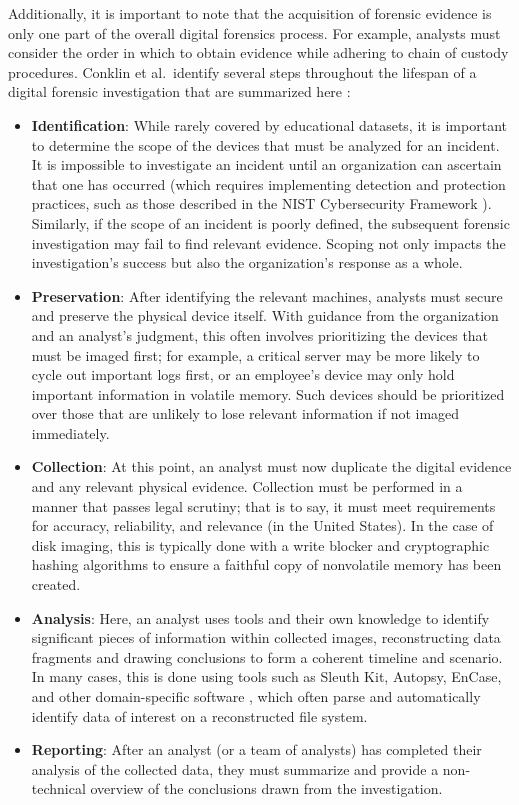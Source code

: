 \documentclass[letterpaper,12pt]{report}
\def\tightlist{}
\begin{document}
Additionally, it is important to note that the acquisition of forensic
evidence is only one part of the overall digital forensics process. For
example, analysts must consider the order in which to obtain evidence
while adhering to chain of custody procedures. Conklin et al.~identify
several steps throughout the lifespan of a digital forensic
investigation that are summarized here
\cite{conklinComputerForensics2022}:

\begin{itemize}
\tightlist
\item
  \textbf{Identification}: While rarely covered by educational datasets,
  it is important to determine the scope of the devices that must be
  analyzed for an incident. It is impossible to investigate an incident
  until an organization can ascertain that one has occurred (which
  requires implementing detection and protection practices, such as
  those described in the NIST Cybersecurity Framework
  \cite{nistNISTCybersecurityFramework2023}). Similarly, if the
  scope of an incident is poorly defined, the subsequent forensic
  investigation may fail to find relevant evidence. Scoping not only
  impacts the investigation's success but also the organization's
  response as a whole.
\item
  \textbf{Preservation}: After identifying the relevant machines,
  analysts must secure and preserve the physical device itself. With
  guidance from the organization and an analyst's judgment, this often
  involves prioritizing the devices that must be imaged first; for
  example, a critical server may be more likely to cycle out important
  logs first, or an employee's device may only hold important
  information in volatile memory. Such devices should be prioritized
  over those that are unlikely to lose relevant information if not
  imaged immediately.
\item
  \textbf{Collection}: At this point, an analyst must now duplicate the
  digital evidence and any relevant physical evidence. Collection must
  be performed in a manner that passes legal scrutiny; that is to say,
  it must meet requirements for accuracy, reliability, and relevance
  \cite{conklinComputerForensics2022,garfinkelBringingScienceDigital2009}
  (in the United States). In the case of disk imaging, this is typically
  done with a write blocker and cryptographic hashing algorithms to
  ensure a faithful copy of nonvolatile memory has been created.
\item
  \textbf{Analysis}: Here, an analyst uses tools and their own knowledge
  to identify significant pieces of information within collected images,
  reconstructing data fragments and drawing conclusions to form a
  coherent timeline and scenario. In many cases, this is done using
  tools such as Sleuth Kit, Autopsy, EnCase, and other domain-specific
  software \cite{jonesInsightDigitalForensics2022}, which often
  parse and automatically identify data of interest on a reconstructed
  file system.
\item
  \textbf{Reporting}: After an analyst (or a team of analysts) has
  completed their analysis of the collected data, they must summarize
  and provide a non-technical overview of the conclusions drawn from the
  investigation.
\end{itemize}
\end{document}
